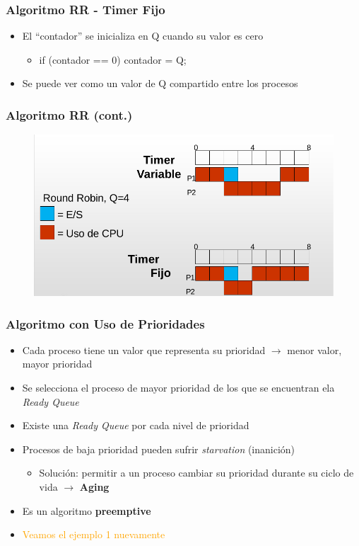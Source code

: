 \begin{frame}
  \frametitle{Algoritmo \textbf{RR - Timer Fijo}}
  \begin{itemize}
  		\item El ``contador'' se inicializa en Q cuando su valor es cero
  		\begin{itemize}
  			\item if (contador == 0) contador = Q;
  		\end{itemize}
		\item Se puede ver como un valor de Q compartido entre los procesos
  \end{itemize}
\end{frame}

\begin{frame}
  \frametitle{Algoritmo \textbf{RR} (cont.)}
	\begin{figure}
	    \includegraphics[scale=0.4]{images/ejemploRR.png}
	\end{figure}
\end{frame}

\begin{frame}
  \frametitle{Algoritmo con \textbf{Uso de Prioridades}}
  \begin{itemize}
  		\item Cada proceso tiene un valor que representa su prioridad $\rightarrow$ menor valor, mayor prioridad
		\item Se selecciona el proceso de mayor prioridad de los que se encuentran ela \emph{Ready Queue}
		\item Existe una \emph{Ready Queue} por cada nivel de prioridad
		\item Procesos de baja prioridad pueden sufrir \emph{starvation} (inanición)
		\begin{itemize}
			\item Solución: permitir a un proceso cambiar su prioridad durante su ciclo de vida $\rightarrow$ \textbf{Aging}
		\end{itemize}
		\item Es un algoritmo \textbf{preemptive}
		\pause
		\item \textcolor{orange}{Veamos el ejemplo 1 nuevamente}
  \end{itemize}
\end{frame}

